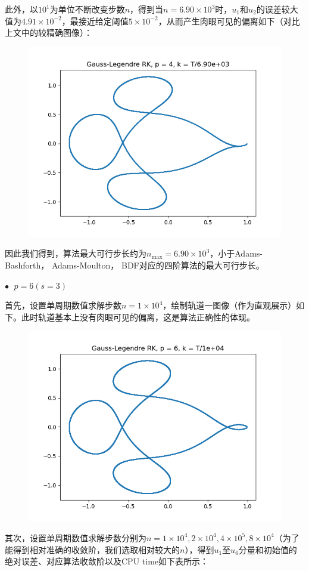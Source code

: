 \documentclass{ctexart}
\begin{document}
\begin{sloppypar}
此外，以$10^1$为单位不断改变步数$n$，得到当$n = 6.90 \times 10^3$时，$u_1$和$u_2$的误差较大值为$4.91 \times 10^{-2}$，最接近给定阈值$5 \times 10^{-2}$，从而产生肉眼可见的偏离如下（对比上文中的较精确图像）：
\begin{figure}[H]
\centering
\includegraphics[scale = 0.45]{./report_src/Figure_32.png}
\end{figure}
因此我们得到，算法最大可行步长约为$n_{\max} = 6.90 \times 10^3$，小于Adams-Bashforth， Adams-Moulton， BDF对应的四阶算法的最大可行步长。

$\bullet \;$ $p = 6(s=3)$

首先，设置单周期数值求解步数$n = 1 \times 10^4$，绘制轨道一图像（作为直观展示）如下。此时轨道基本上没有肉眼可见的偏离，这是算法正确性的体现。
\begin{figure}[H]
\centering
\includegraphics[scale = 0.45]{./report_src/Figure_33.png}
\end{figure}
其次，设置单周期数值求解步数分别为$n = 1 \times 10^4,2 \times 10^4,4 \times 10^5, 8 \times 10^4$（为了能得到相对准确的收敛阶，我们选取相对较大的$n$），得到$u_1$至$u_6$分量和初始值的绝对误差、对应算法收敛阶以及CPU time如下表所示：


\end{sloppypar}
\end{document}
